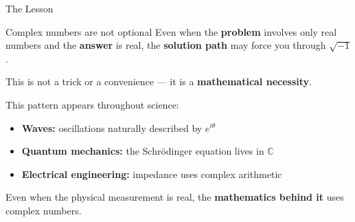 \documentclass[10pt]{beamer}
\theoremstyle{definition}
\newcommand{\x}[1]{\alert{\textbf{#1}}}
\begin{document}
\begin{frame}{The Lesson}

\begin{block}{Complex numbers are not optional}
Even when the \x{problem} involves only real numbers and the \x{answer} is real, the \x{solution path} may force you through $\sqrt{-1}$.

\vfill

This is not a trick or a convenience --- it is a \x{mathematical necessity}.
\end{block}

\vfill\pause

This pattern appears throughout science:

\vfill

\begin{itemize}
\item \x{Waves:} oscillations naturally described by $e^{i\theta}$
\item \x{Quantum mechanics:} the Schr\"odinger equation lives in $\mathbb{C}$
\item \x{Electrical engineering:} impedance uses complex arithmetic
\end{itemize}

\vfill

Even when the physical measurement is real, the \x{mathematics behind it} uses complex numbers.

\end{frame}


\end{document}
